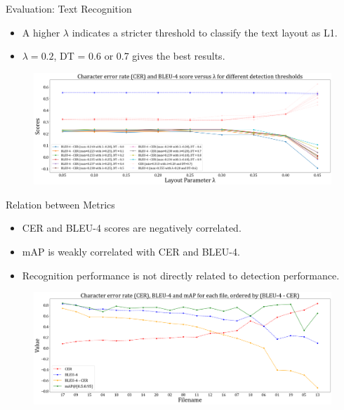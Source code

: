 \documentclass{beamer}
\begin{document}
\begin{frame}
    \begin{center}
        \Large{Evaluation: Text Recognition}
    \end{center}
    \begin{itemize}
        \item A higher $\lambda$ indicates a stricter threshold to classify the text layout as L1.
        \item $\lambda=0.2$, DT = 0.6 or 0.7 gives the best results.
    \end{itemize}
    \begin{figure}
        \centering
        \includegraphics[width=\textwidth]{figures/cer_bleu.png}
    \end{figure}
\end{frame}

\begin{frame}
    \begin{center}
        \Large{Relation between Metrics}
    \end{center}
    \begin{itemize}
        \item CER and BLEU-4 scores are negatively correlated.
        \item mAP is weakly correlated with CER and BLEU-4.
        \item Recognition performance is not directly related to detection performance.
    \end{itemize}
    \begin{figure}
        \centering
        \includegraphics[width=\textwidth]{figures/cer_bleu_map.png}
    \end{figure}
\end{frame}
\end{document}

